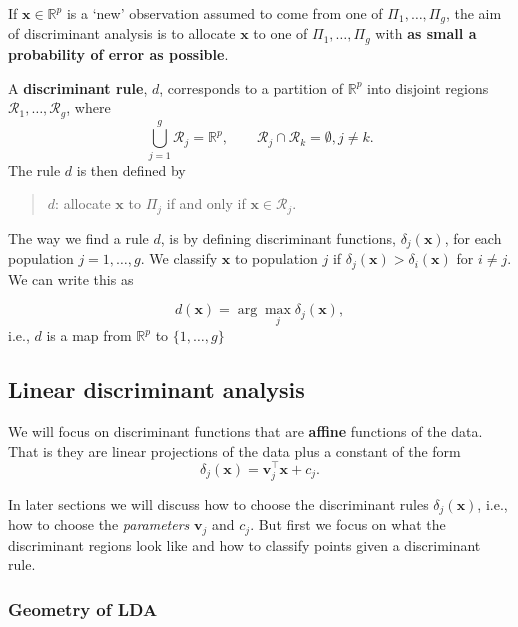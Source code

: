 \documentclass[
]{book}
\theoremstyle{definition}
\theoremstyle{definition}
\theoremstyle{definition}
\theoremstyle{definition}
\theoremstyle{remark}
\begin{document}
If \(\mathbf x\in \mathbb R^p\) is a `new' observation assumed to come from one of \(\Pi_1, \ldots , \Pi_g\), the aim of discriminant analysis is to allocate \(\mathbf x\) to one of \(\Pi_1, \ldots , \Pi_g\) with \textbf{as small a
probability of error as possible}.

A \textbf{discriminant rule}, \(d\), corresponds to a partition of \(\mathbb R^p\) into disjoint regions \(\mathcal R_1, \ldots, \mathcal R_g\), where
\[\bigcup_{j=1}^g \mathcal R_j = \mathbb R^p, \qquad \mathcal R_j \cap \mathcal R_k = \emptyset, j \neq k.\]
The rule \(d\) is then defined by

\begin{quote}
\(d\): allocate \(\mathbf x\) to \(\Pi_j\) if and only if \(\mathbf x\in \mathcal R_j\).
\end{quote}

The way we find a rule \(d\), is by defining discriminant functions, \(\delta_j(\mathbf x)\), for each population \(j=1, \ldots, g\). We classify \(\mathbf x\) to population \(j\) if \(\delta_j(\mathbf x)>\delta_i(\mathbf x)\) for \(i \not = j\). We can write this as

\[d(\mathbf x) = \arg \max_j \delta_j(\mathbf x),\]
i.e., \(d\) is a map from \(\mathbb{R}^p\) to \(\{1, \ldots, g\}\)

\subsection*{Linear discriminant analysis}\label{linear-discriminant-analysis}

We will focus on discriminant functions that are \textbf{affine} functions of the data. That is they are linear projections of the data plus a constant of the form
\begin{equation}
\delta_j(\mathbf x) = \mathbf v_j^\top \mathbf x+ c_j.  \label{eq:ldadiscrim}
\end{equation}

In later sections we will discuss how to choose the discriminant rules \(\delta_j(\mathbf x)\), i.e., how to choose the \emph{parameters} \(\mathbf v_j\) and \(c_j\). But first we focus on what the
discriminant regions look like and how to classify points given a discriminant rule.

\subsubsection*{Geometry of LDA}\label{geometry-of-lda}
\end{document}
